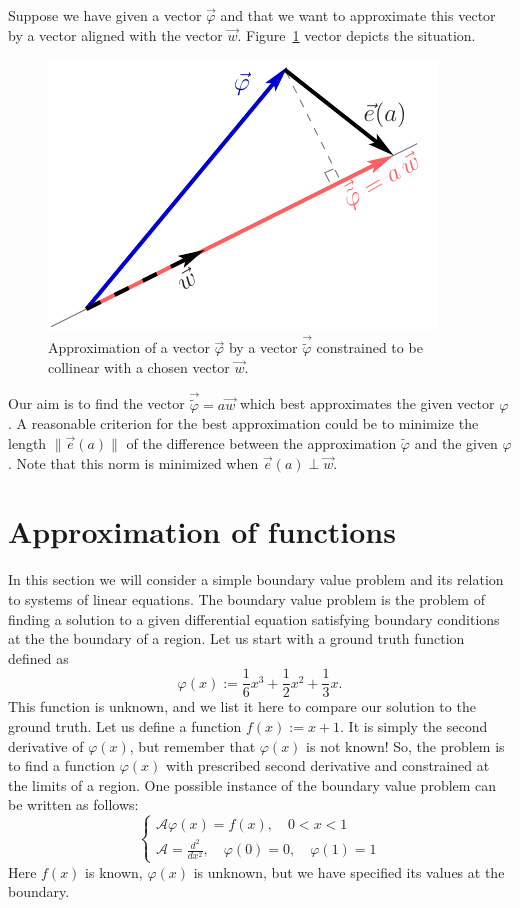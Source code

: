 \documentclass[notitlepage,oneside]{book}
\begin{document}
Suppose we have given a vector $\vec{\varphi}$ and that we want to approximate this vector by a vector aligned with the vector $\vec{w}$.
Figure~\ref{fig:vector_approximation} vector depicts the situation.

\begin{figure}[ht]
	\centering
	\includegraphics[width=.4\linewidth]{img/vector_approximation.pdf}
	\caption{Approximation of a vector $\vec{\varphi}$ by a vector $\vec{\tilde{\varphi}}$ constrained to be collinear with a chosen vector $\vec{w}$.}
	\label{fig:vector_approximation}
\end{figure}

Our aim is to find the vector $\vec{\tilde{\varphi}} = a\vec{w}$ which best approximates the given vector $\varphi$.
A reasonable criterion for the best approximation could be to minimize the length $\|\vec{e}(a)\|$ of the difference between the approximation $\tilde\varphi$ and the given $\varphi$.
Note that this norm is minimized when $\vec{e}(a) \perp \vec{w}$.

\section{Approximation of functions}
\label{sec:equadiff}

In this section we will consider a simple boundary value problem and its relation to systems of linear equations.
The boundary value problem is the problem of finding a solution to a given differential equation satisfying boundary conditions at the the boundary of a region.
Let us start with a ground truth function defined as 
$$
\varphi(x) := \frac{1}{6} x^3 + \frac{1}{2} x^2 + \frac{1}{3} x.
$$
This function is unknown, and we list it here to compare our solution to the ground truth.
Let us define a function $f(x) := x+1$.
It is simply the second derivative of $\varphi(x)$, but remember that $\varphi(x)$ is not known!
So, the problem is to find a function $\varphi(x)$ with prescribed second derivative and constrained at the limits of a region.
One possible instance of the boundary value problem can be written as follows:
\begin{equation}
\label{eq:femproblem}
\left\{
\begin{split}
\mathcal A\varphi(x) = f(x), \quad 0 < x < 1\\
\mathcal A=\frac{d^2}{dx^2}, \quad \varphi(0)=0, \quad \varphi(1)=1
\end{split}
\right.
\end{equation}
Here $f(x)$ is known, $\varphi(x)$ is unknown, but we have specified its values at the boundary.
\end{document}
